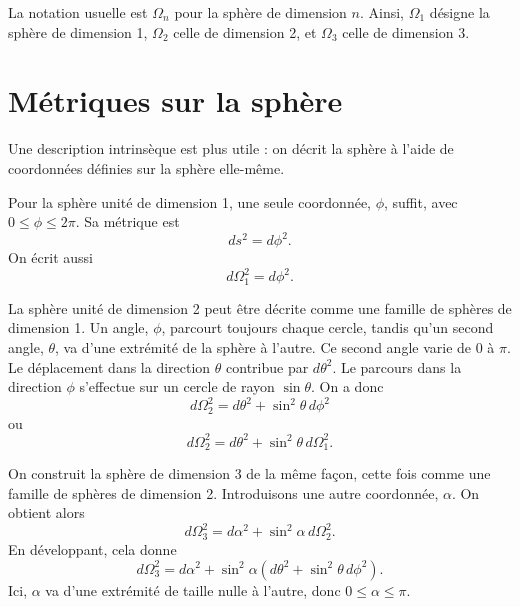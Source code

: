 La notation usuelle est \(\Omega_n\) pour la sphère de dimension \(n\). Ainsi, \(\Omega_1\) désigne la sphère de dimension 1, \(\Omega_2\) celle de dimension 2, et \(\Omega_3\) celle de dimension 3.

\section{Métriques sur la sphère}

Une description intrinsèque est plus utile : on décrit la sphère à l’aide de coordonnées définies sur la sphère elle-même.

Pour la sphère unité de dimension 1, une seule coordonnée, \(\phi\), suffit, avec \(0\leq \phi \leq 2\pi\). Sa métrique est
\begin{equation}
ds^2=d\phi^2.
\end{equation}
On écrit aussi
\begin{equation}
d\Omega_1^2=d\phi^2.
\end{equation}

La sphère unité de dimension 2 peut être décrite comme une famille de sphères de dimension 1. Un angle, \(\phi\), parcourt toujours chaque cercle, tandis qu’un second angle, \(\theta\), va d’une extrémité de la sphère à l’autre. Ce second angle varie de \(0\) à \(\pi\). Le déplacement dans la direction \(\theta\) contribue par \(d\theta^2\). Le parcours dans la direction \(\phi\) s’effectue sur un cercle de rayon \(\sin\theta\). On a donc
\begin{equation}
d\Omega_2^2=d\theta^2+\sin^2\theta\,d\phi^2
\end{equation}
ou
\begin{equation}
d\Omega_2^2=d\theta^2+\sin^2\theta\,d\Omega_1^2.
\end{equation}

On construit la sphère de dimension 3 de la même façon, cette fois comme une famille de sphères de dimension 2. Introduisons une autre coordonnée, \(\alpha\). On obtient alors
\begin{equation}
d\Omega_3^2=d\alpha^2+\sin^2\alpha\,d\Omega_2^2.
\end{equation}
En développant, cela donne
\begin{equation}
d\Omega_3^2=d\alpha^2+\sin^2\alpha\left(d\theta^2+\sin^2\theta\,d\phi^2\right).
\end{equation}
Ici, \(\alpha\) va d’une extrémité de taille nulle à l’autre, donc \(0\leq \alpha \leq \pi\).


